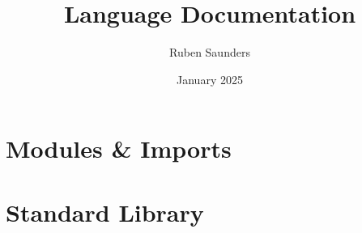 \documentclass{article}
\title{Language Documentation}
\author{Ruben Saunders}
\date{January 2025}
\begin{document}
    \maketitle
    \tableofcontents

    \newpage

    

    

    

    

    

    

    

    \section{Modules \& Imports}

    \section{Standard Library}
\end{document}
